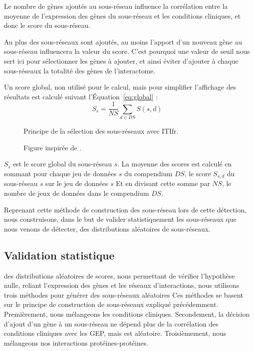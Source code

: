 			Le nombre de gènes ajoutés au sous-réseau influence la corrélation entre la moyenne de l'expression des gènes du sous-réseau et les conditions cliniques, et donc le score du sous-réseau.

\pagebreak

			Au plus des sous-réseaux sont ajoutés, au moins l'apport d'un nouveau gène au sous-réseau influencera la valeur du score.
			C'est pourquoi une valeur de seuil nous sert ici pour sélectionner les gènes à ajouter, et ainsi éviter d'ajouter à chaque sous-réseaux la totalité des gènes de l'interactome.

			Un score global, non utilisé pour le calcul, mais pour simplifier l'affichage des résultats est calculé suivant l'Équation~\ref{eq:global} :
			\begin{equation}\label{eq:global}
				S_{s}=\frac{1}{NS}\sum_{d\in DS}S(s,d)
			\end{equation}

			\begin{figure}
				\begin{center}
					\def\svgwidth{\columnwidth}
					\caption{Principe de la sélection des sous-réseaux avec \acl{ITIfr}.}
					\label{fig:Algorithme}
				\end{center}
				\caption*{Figure inspirée de \citeauthor{Garcia2012}.}
			\end{figure}
			$S_{s}$ est le score global du sous-réseau $s$.
			La moyenne des scores est calculé en sommant pour chaque jeu de données $s$ du compendium $DS$, le score $S_{s,d}$ du sous-réseau $s$ sur le jeu de données $s$
			Et en divisant cette somme par $NS$, le nombre de jeux de données dans le compendium $DS$.
		
			Reprenant cette méthode de construction des sous-réseau lors de cette détection, nous construisons, dans le but de valider statistiquement les sous-réseaux que nous venons de détecter, des distributions aléatoires de sous-réseaux.

		\subsection{\textcolor{green!45!black}{Validation statistique}}\label{sec:Validation}
			 des distributions aléatoires de scores, nous permettant de vérifier l'hypothèse nulle, reliant l'expression des gènes et les réseaux d'interactions, nous utilisons trois méthodes pour générer des sous-réseaux aléatoires
			Ces méthodes se basent sur le principe de construction de sous-réseaux expliqué précédemment.
			Premièrement, nous mélangeons les conditions cliniques.
			Secondement, la décision d'ajout d'un gène à un sous-réseau ne dépend plus de la corrélation des conditions cliniques avec les \acs{GEP}, mais est aléatoire.
			Troisièmement, nous mélangeons nos interactions protéines-protéines.
			
